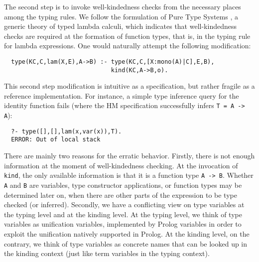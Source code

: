 \documentclass[runningheads,a4paper]{llncs}
\begin{document}
The second step is to invoke well-kindedness checks from the necessary
places among the typing rules. We follow the formulation of Pure Type
Systems \cite{Barendregt91}, a generic theory of typed lambda calculi,
which indicates that well-kindedness checks are required at the
formation of function types, that is, in the typing rule for lambda
expressions. One would naturally attempt the following modification:%
{\small\vspace*{-1ex}
\begin{verbatim}
  type(KC,C,lam(X,E),A->B) :- type(KC,C,[X:mono(A)|C],E,B),
                              kind(KC,A->B,o).
\end{verbatim} \vspace*{-.7ex} }\noindent
This second step modification is intuitive as a specification, but
rather fragile as a reference implementation. For instance,
a simple type inference query for the identity function fails
(where the HM specification successfully infers \verb|T = A -> A|):{\small \vspace*{-1ex}
\begin{verbatim}
  ?- type([],[],lam(x,var(x)),T).
  ERROR: Out of local stack
\end{verbatim} \vspace*{-.7ex} }

There are mainly two reasons for the erratic behavior.
Firstly, there is not enough information at the moment of
well-kindedness checking. At the invocation of \verb|kind|,
the only available information is that it is a function type \verb|A -> B|.
Whether \verb|A| and \verb|B| are variables, type constructor applications,
or function types may be determined later on, when there are other parts
of the expression to be type checked (or inferred). Secondly, we have
a conflicting view on type variables at the typing level and
at the kinding level. At the typing level, we think of type variables as
unification variables, implemented by Prolog variables in order to exploit
the unification natively supported in Prolog. At the kinding level,
on the contrary, we think of type variables as concrete names that
can be looked up in the kinding context (just like term variables
in the typing context).
\end{document}
